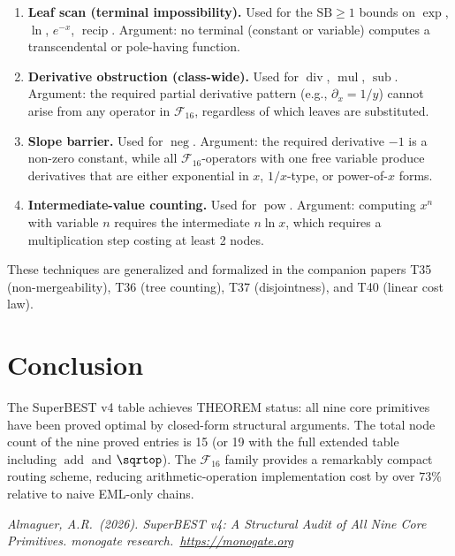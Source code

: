\documentclass[12pt,a4paper]{article}
\theoremstyle{definition}
\newcommand{\recip}{\operatorname{recip}}
\newcommand{\divop}{\operatorname{div}}
\newcommand{\mulop}{\operatorname{mul}}
\newcommand{\subop}{\operatorname{sub}}
\newcommand{\addop}{\operatorname{add}}
\newcommand{\negop}{\operatorname{neg}}
\newcommand{\powop}{\operatorname{pow}}
\newcommand{\SB}{\mathrm{SB}}
\newcommand{\F}{\mathcal{F}_{16}}
\begin{document}
\begin{enumerate}
\item \textbf{Leaf scan (terminal impossibility).}
  Used for the $\SB \ge 1$ bounds on $\exp$, $\ln$, $e^{-x}$, $\recip$.
  Argument: no terminal (constant or variable) computes a transcendental or
  pole-having function.

\item \textbf{Derivative obstruction (class-wide).}
  Used for $\divop$, $\mulop$, $\subop$.
  Argument: the required partial derivative pattern (e.g., $\partial_x = 1/y$)
  cannot arise from any operator in $\F$, regardless of which leaves are substituted.

\item \textbf{Slope barrier.}
  Used for $\negop$.
  Argument: the required derivative $-1$ is a non-zero constant, while all
  $\F$-operators with one free variable produce derivatives that are either
  exponential in $x$, $1/x$-type, or power-of-$x$ forms.

\item \textbf{Intermediate-value counting.}
  Used for $\powop$.
  Argument: computing $x^n$ with variable $n$ requires the intermediate $n\ln x$,
  which requires a multiplication step costing at least 2 nodes.
\end{enumerate}

These techniques are generalized and formalized in the companion papers
T35 (non-mergeability), T36 (tree counting), T37 (disjointness), and T40
(linear cost law).

\section*{Conclusion}

The SuperBEST v4 table achieves THEOREM status: all nine core primitives have
been proved optimal by closed-form structural arguments.  The total node count
of the nine proved entries is 15 (or 19 with the full extended table including
$\addop$ and $\sqrtop$).  The $\mathcal{F}_{16}$ family provides a remarkably
compact routing scheme, reducing arithmetic-operation implementation cost by
over $73\%$ relative to naive EML-only chains.

\bigskip
\noindent\textit{Almaguer, A.R.\ (2026).
SuperBEST v4: A Structural Audit of All Nine Core Primitives.
monogate research.\ \url{https://monogate.org}}
\end{document}
